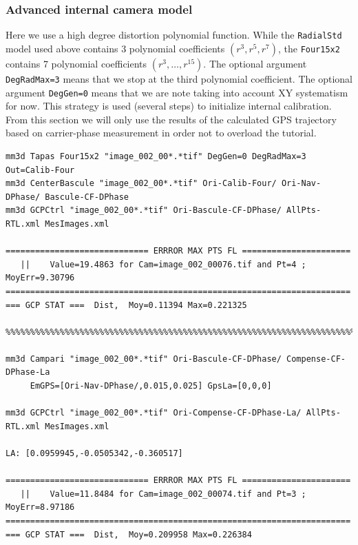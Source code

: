 \subsubsection{Advanced internal camera model}
Here we use a high degree distortion polynomial function. While the {\tt RadialStd} model used above contains 3 polynomial coefficients $(r^{3}, r^{5}, r^{7})$, the {\tt Four15x2} contains 7 polynomial coefficients $(r^{3}, \dots, r^{15})$. The optional argument {\tt DegRadMax=3} means that we stop at the third polynomial coefficient. The optional argument {\tt DegGen=0} means that we are note taking into account XY systematism for now. This strategy is used (several steps) to initialize internal calibration. From this section we will only use the results of the calculated GPS trajectory based on carrier-phase measurement in order not to overload the tutorial.

\begin{verbatim}
mm3d Tapas Four15x2 "image_002_00*.*tif" DegGen=0 DegRadMax=3 Out=Calib-Four
mm3d CenterBascule "image_002_00*.*tif" Ori-Calib-Four/ Ori-Nav-DPhase/ Bascule-CF-DPhase
mm3d GCPCtrl "image_002_00*.*tif" Ori-Bascule-CF-DPhase/ AllPts-RTL.xml MesImages.xml

============================= ERRROR MAX PTS FL ======================
   ||    Value=19.4863 for Cam=image_002_00076.tif and Pt=4 ; MoyErr=9.30796
======================================================================
=== GCP STAT ===  Dist,  Moy=0.11394 Max=0.221325

%%%%%%%%%%%%%%%%%%%%%%%%%%%%%%%%%%%%%%%%%%%%%%%%%%%%%%%%%%%%%%%%%%%%%%%%%%%%%%%%%%%%%%%%%       
       
mm3d Campari "image_002_00*.*tif" Ori-Bascule-CF-DPhase/ Compense-CF-DPhase-La 
     EmGPS=[Ori-Nav-DPhase/,0.015,0.025] GpsLa=[0,0,0]
     
mm3d GCPCtrl "image_002_00*.*tif" Ori-Compense-CF-DPhase-La/ AllPts-RTL.xml MesImages.xml

LA: [0.0959945,-0.0505342,-0.360517]

============================= ERRROR MAX PTS FL ======================
   ||    Value=11.8484 for Cam=image_002_00074.tif and Pt=3 ; MoyErr=8.97186
======================================================================
=== GCP STAT ===  Dist,  Moy=0.209958 Max=0.226384
\end{verbatim}


